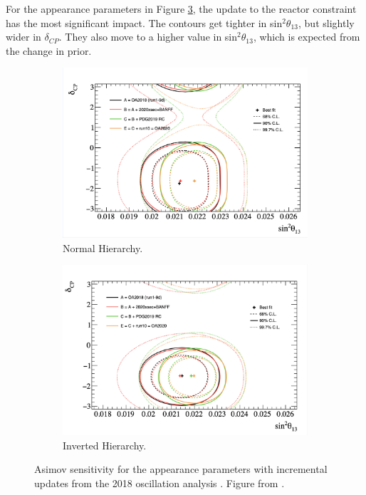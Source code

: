 For the appearance parameters in Figure \ref{fig:20182020AppPT}, the update to the reactor constraint has the most significant impact. The contours get tighter in sin$^2\theta_{13}$, but slightly wider in $\delta_{CP}$. They also move to a higher value in sin$^2\theta_{13}$, which is expected from the change in prior.

\begin{figure}[!htbp]
\centering
\begin{subfigure}{.7\textwidth}
  \centering
  \includegraphics[width=0.95\linewidth, trim={0.5mm 0.5mm 0mm 0mm}, clip]{figs/jointPTheta_appNH}
  \caption{Normal Hierarchy.}
  \label{fig:20182020PTAppNH}
\end{subfigure}
\begin{subfigure}{.7\textwidth}
  \centering
  \includegraphics[width=0.95\linewidth, trim={0mm 0mm 0.5mm 0mm}, clip]{figs/jointPTheta_appIH}
  \caption{Inverted Hierarchy.}
  \label{fig:20182020PTAppIH}
\end{subfigure}
\caption{Asimov sensitivity for the appearance parameters with incremental updates from the 2018 oscillation analysis \cite{t2knature}. Figure from \cite{tn397}.}
\label{fig:20182020AppPT}
\end{figure}

